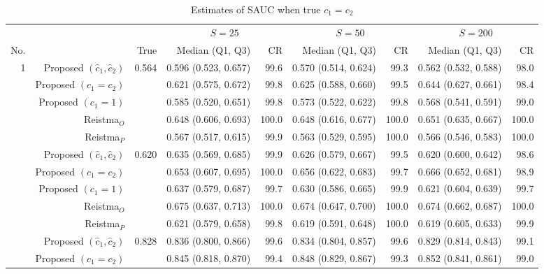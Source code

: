 \begin{table}

\caption{Estimates of SAUC when true $c_1 = c_2$}
\centering
\begin{threeparttable}
\begin{tabular}[t]{rrrrrrrrr}
\toprule
\multicolumn{1}{c}{} & \multicolumn{1}{c}{} & \multicolumn{1}{c}{} & \multicolumn{2}{c}{$S = 25$} & \multicolumn{2}{c}{$S = 50$} & \multicolumn{2}{c}{$S = 200$} \\
\cmidrule(l{3pt}r{3pt}){4-5} \cmidrule(l{3pt}r{3pt}){6-7} \cmidrule(l{3pt}r{3pt}){8-9}
No. &   & True & Median (Q1, Q3) & CR & Median (Q1, Q3) & CR & Median (Q1, Q3) & CR\\
\midrule
1 & Proposed $(\hat{c}_1, \hat{c}_2)$ & 0.564 & 0.596 (0.523, 0.657) & 99.6 & 0.570 (0.514, 0.624) & 99.3 & 0.562 (0.532, 0.588) & 98.0\\
 & Proposed $(c_1 = c_2)$ &  & 0.621 (0.575, 0.672) & 99.8 & 0.625 (0.588, 0.660) & 99.5 & 0.644 (0.627, 0.661) & 98.4\\
 & Proposed $(c_1 = 1)$ &  & 0.585 (0.520, 0.651) & 99.8 & 0.573 (0.522, 0.622) & 99.8 & 0.568 (0.541, 0.591) & 99.0\\
 & Reistma$_O$ &  & 0.648 (0.606, 0.693) & 100.0 & 0.648 (0.616, 0.677) & 100.0 & 0.651 (0.635, 0.667) & 100.0\\
 & Reistma$_P$ &  & 0.567 (0.517, 0.615) & 99.9 & 0.563 (0.529, 0.595) & 100.0 & 0.566 (0.546, 0.583) & 100.0\\
\addlinespace
2 & Proposed $(\hat{c}_1, \hat{c}_2)$ & 0.620 & 0.635 (0.569, 0.685) & 99.9 & 0.626 (0.579, 0.667) & 99.5 & 0.620 (0.600, 0.642) & 98.6\\
 & Proposed $(c_1 = c_2)$ &  & 0.653 (0.607, 0.695) & 100.0 & 0.656 (0.622, 0.683) & 99.7 & 0.666 (0.652, 0.681) & 98.9\\
 & Proposed $(c_1 = 1)$ &  & 0.637 (0.579, 0.687) & 99.7 & 0.630 (0.586, 0.665) & 99.9 & 0.621 (0.604, 0.639) & 99.7\\
 & Reistma$_O$ &  & 0.675 (0.637, 0.713) & 100.0 & 0.674 (0.647, 0.700) & 100.0 & 0.674 (0.662, 0.687) & 100.0\\
 & Reistma$_P$ &  & 0.621 (0.579, 0.658) & 99.8 & 0.619 (0.591, 0.648) & 100.0 & 0.619 (0.605, 0.633) & 99.9\\
\addlinespace
3 & Proposed $(\hat{c}_1, \hat{c}_2)$ & 0.828 & 0.836 (0.800, 0.866) & 99.6 & 0.834 (0.804, 0.857) & 99.6 & 0.829 (0.814, 0.843) & 99.1\\
 & Proposed $(c_1 = c_2)$ &  & 0.845 (0.818, 0.870) & 99.4 & 0.848 (0.829, 0.867) & 99.3 & 0.852 (0.841, 0.861) & 99.0\\

\end{tabular}
\end{threeparttable}
\end{table}
